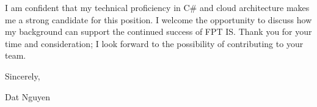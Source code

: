 \documentclass[letterpaper,11pt]{article}
\begin{document}
I am confident that my technical proficiency in C\# and cloud architecture makes me a strong candidate for this position. I welcome the opportunity to discuss how my background can support the continued success of FPT IS. Thank you for your time and consideration; I look forward to the possibility of contributing to your team.

Sincerely,

\vspace{40pt}

Dat Nguyen
\end{document}
